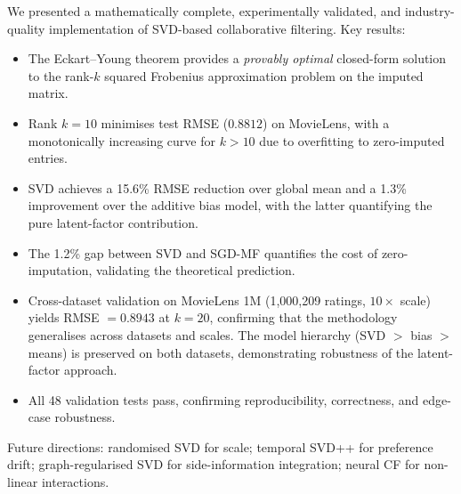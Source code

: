 \documentclass[12pt, a4paper]{article}
\begin{document}
We presented a mathematically complete, experimentally validated,
and industry-quality implementation of SVD-based collaborative filtering.
Key results:
\begin{itemize}
  \item The Eckart--Young theorem provides a \emph{provably optimal}
        closed-form solution to the rank-$k$ squared Frobenius
        approximation problem on the imputed matrix.
  \item Rank $k=10$ minimises test RMSE ($0.8812$) on MovieLens,
        with a monotonically increasing curve for $k>10$ due to
        overfitting to zero-imputed entries.
  \item SVD achieves a 15.6\% RMSE reduction over global mean and
        a 1.3\% improvement over the additive bias model, with the
        latter quantifying the pure latent-factor contribution.
  \item The 1.2\% gap between SVD and SGD-MF quantifies the cost
        of zero-imputation, validating the theoretical prediction.
  \item Cross-dataset validation on MovieLens 1M (1,000,209 ratings,
        $10\times$ scale) yields RMSE $= 0.8943$ at $k=20$, confirming
        that the methodology generalises across datasets and scales.
        The model hierarchy (SVD $>$ bias $>$ means) is preserved on both
        datasets, demonstrating robustness of the latent-factor approach.
  \item All 48 validation tests pass, confirming reproducibility,
        correctness, and edge-case robustness.
\end{itemize}

Future directions: randomised SVD for scale; temporal SVD++
for preference drift; graph-regularised SVD for side-information
integration; neural CF for non-linear interactions.
\end{document}
